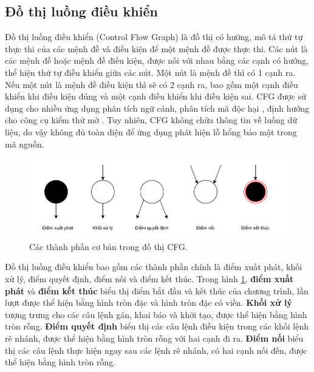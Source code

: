 \subsection{Đồ thị luồng điều khiển}

Đồ thị luồng điều khiển (Control Flow Graph) \cite{yan2019classifying} là đồ thị có hướng, mô tả thứ tự thực thi của các mệnh đề và điều kiện để một mệnh đề được thực thi.
Các nút là các mệnh đề hoặc mệnh đề điều kiện, được nối với nhau bằng các cạnh có hướng, thể hiện thứ tự điều khiển giữa các nút.
Một nút là mệnh đề thì có 1 cạnh ra.
Nếu một nút là mệnh đề điều kiện thì sẽ có 2 cạnh ra, bao gồm một cạnh điều khiển khi điều kiện đúng và một cạnh điều khiển khi điều kiện sai.
CFG được sử dụng cho nhiều ứng dụng phân tích ngữ cảnh, phân tích mã độc hại \cite{gascon2013structural}, định hướng cho công cụ kiểm thử mờ \cite{sparks2007automated}.
Tuy nhiên, CFG không chứa thông tin về luồng dữ liệu, do vậy không đủ toàn diện để ứng dụng phát hiện lỗ hổng bảo mật trong mã nguồn.

\begin{figure}[H]
  \includegraphics[width=1\columnwidth]{figures/c2/c2_cfg_point.drawio.pdf}
  \centering
  \caption{Các thành phần cơ bản trong đồ thị CFG.}
  \label{img:c2_cfg_point}
\end{figure}

Đồ thị luồng điều khiển bao gồm các thành phần chính là điểm xuất phát, khối xử lý, điểm quyết định, điểm nối và điểm kết thúc.
Trong hình \ref{img:c2_cfg_point}, \textbf{điểm xuất phát} và \textbf{điểm kết thúc} biểu thị điểm bắt đầu và kết thúc của chương trình, lần lượt được thể hiện bằng hình tròn đặc và hình tròn đặc có viền.
\textbf{Khối xử lý} tượng trưng cho các câu lệnh gán, khai báo và khởi tạo, được thể hiện bằng hình tròn rỗng.
\textbf{Điểm quyết định} biểu thị các câu lệnh điều kiện trong các khối lệnh rẽ nhánh, được thể hiện bằng hình tròn rỗng với hai cạnh đi ra.
\textbf{Điểm nối} biểu thị các câu lệnh thực hiện ngay sau các lệnh rẽ nhánh, có hai cạnh nối đến, được thể hiện bằng hình tròn rỗng.

